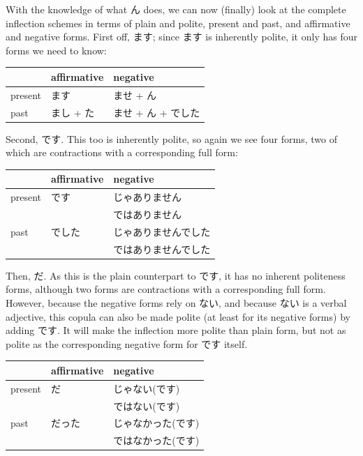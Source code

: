 \documentclass[11pt, b5paper, twoside, openright, onecolumn]{book}
\newenvironment{mytabular}[1]{\noindent\hspace{0.4in}
\begin{tabular}[h]{#1}}{\end{tabular}}
\begin{document}
With the knowledge of what ん does‚ we can now (finally) look at the complete inflection schemes in terms of plain and polite‚ present and past‚ and affirmative and negative forms. First off‚ ます; since ます is inherently polite‚ it only has four forms we need to know:

\vspace{0.5cm}
\smaller
\begin{mytabular}{| l  l  l |}\hline 
\rule{0pt}{2.4ex} & affirmative & negative\\ 
\hline
\rule{0pt}{2.4ex}present & ます & ませ + ん\\ 
\rule{0pt}{2.4ex}past & まし + た & ませ + ん + でした\\ 
\hline 
\end{mytabular}
\larger
\vspace{0.5cm}


Second‚ です. This too is inherently polite‚ so again we see four forms‚ two of which are contractions with a corresponding full form:

\vspace{0.5cm}
\smaller
\begin{mytabular}{| l  l  l |}\hline 
\rule{0pt}{2.4ex} & affirmative & negative\\ 
\hline
\rule{0pt}{2.4ex}present & です & じゃありません\\ 
\rule{0pt}{2.4ex} &  & ではありません\\ 
\rule{0pt}{2.4ex}past & でした & じゃありませんでした\\ 
\rule{0pt}{2.4ex} &  & ではありませんでした\\ 
\hline 
\end{mytabular}
\larger
\vspace{0.5cm}


Then‚ だ. As this is the plain counterpart to です‚ it has no inherent politeness forms‚ although two forms are contractions with a corresponding full form. However‚ because the negative forms rely on ない‚ and because ない is a verbal adjective‚ this copula can also be made polite (at least for its negative forms) by adding です. It will make the inflection more polite than plain form‚ but not as polite as the corresponding negative form for です itself.

\vspace{0.5cm}
\smaller
\begin{mytabular}{| l  l  l |}\hline 
\rule{0pt}{2.4ex} & affirmative & negative\\ 
\hline
\rule{0pt}{2.4ex}present & だ & じゃない(です)\\ 
\rule{0pt}{2.4ex} &  & ではない(です)\\ 
\rule{0pt}{2.4ex}past & だった & じゃなかった(です)\\ 
\rule{0pt}{2.4ex} &  & ではなかった(です)\\ 
\hline 
\end{mytabular}
\larger
\vspace{0.5cm}
\end{document}
